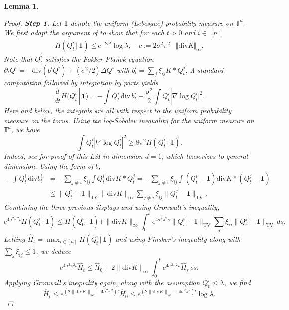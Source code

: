 \documentclass[11pt,reqno]{amsart}
\numberwithin{equation}{section}
\newtheorem{lemma}[theorem]{Lemma}
\theoremstyle{definition}
\def\diver{\mathrm{div}}
\begin{document}
\begin{lemma}
\begin{proof}
	 	 \noindent\textbf{Step 1.}
	Let $\bm{1}$ denote the uniform (Lebesgue) probability measure on $\mathbb{T}^d$. We first adapt the argument of \cite[Proposition 3.1]{carrillo2020long} to show that for each $t > 0$ and $i \in [n]$
	\begin{align}
			H (Q^i_t \, |\,\mathbf{1}) \le e^{-2ct} \log \lambda, \quad c := 2\sigma^2\pi^2 -  \Vert \diver K \Vert_\infty   .  \label{eq: entropy.decay}
		\end{align}
		 Note that $Q^i_t$ satisfies the Fokker-Planck equation $\partial_t Q^i = -\diver(b^iQ^i) + (\sigma^2/2)\Delta Q^i$ with $b^i_t = \sum_{j }\xi_{ij}K * Q^j_t$. A standard computation followed by integration by parts yields
	\begin{equation*}
	\frac{d}{dt}H(Q^i_t\,|\,\bm{1}) = -\int Q^i_t \, \diver \,b^i_t  - \frac{\sigma^2}{2}\int Q^i_t|\nabla \log Q^i_t|^2  .
	\end{equation*}
	Here and below, the integrals are all with respect to the uniform probability measure on the torus.
Using the log-Sobolev inequality for the uniform measure on $\mathbb{T}^d$, we have
\begin{equation}
	\int Q^i_t|\nabla \log Q^i_t|^2 \ge 8\pi^2 H(Q^i_t\,|\,\bm{1}). \label{ineq:LSItorus}
	\end{equation}
	Indeed, see \cite{emery1987simple} for proof of this LSI in dimension $d=1$, which tensorizes to general dimension. Using the form of $b$,
	\begin{align*}
	-\int Q^i_t \,\diver b^i_t &= -\sum_{j\neq i}\xi_{ij}\int  Q^i_t \, \diver K * Q^j_t = -\sum_{j\neq i}\xi_{ij}\int (Q^i_t-\bm{1}) \diver K * (Q^j_t-\bm{1})  \\
		&\le \|Q^i_t-\bm{1}\|_{\mathrm{TV}} \| \diver K \|_\infty \sum_{j\neq i}\xi_{ij}\|Q^j_t-\bm{1}\|_{\mathrm{TV}}.
	\end{align*}
	Combining the three previous displays and using Gronwall's inequality,
	\begin{equation*}
	e^{4 \sigma^2\pi^2 t} H(Q^i_t\,|\,\bm{1}) \le H(Q^i_0\,|\,\bm{1}) + \| \diver K \|_\infty \int_0^t e^{4 \sigma^2\pi^2 s} \|Q^i_s-\bm{1}\|_{\mathrm{TV}} \sum_{j }\xi_{ij}\|Q^j_s-\bm{1}\|_{\mathrm{TV}} \,ds.
	\end{equation*}
	Letting $\widehat{H}_t = \max_{i \in [n]}H(Q^i_t\,|\,\bm{1})$ and using Pinsker's inequality along with $\sum_j \xi_{ij} \le 1$, we deduce
	\begin{equation*}
	e^{4 \sigma^2\pi^2 t} \widehat{H}_t \le \widehat{H}_0 + 2\| \diver K \|_\infty \int_0^t e^{4 \sigma^2\pi^2 s} \widehat{H}_s \, ds.
	\end{equation*}
	Applying Gronwall's inequality again, along with the assumption $Q^i_0 \le \lambda$, we find
	\begin{equation*}
	\widehat{H}_t \le  e^{(2\| \diver K \|_\infty - 4\sigma^2\pi^2)t} \widehat{H}_0 \le e^{(2\| \diver K \|_\infty - 4\sigma^2\pi^2)t}  \log \lambda .
	\end{equation*}
	

\end{proof}
\end{lemma}
\end{document}
